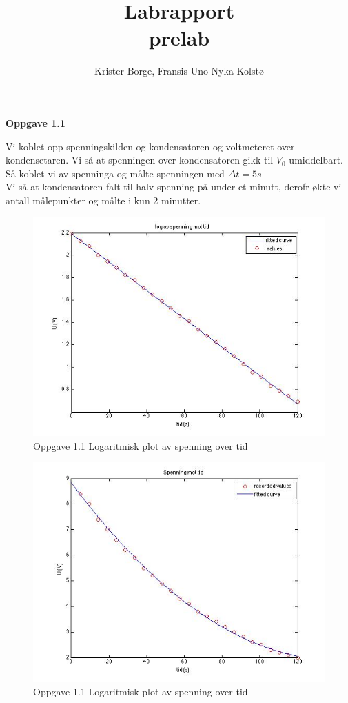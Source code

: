 \documentclass[12pt,a4paper,leqno]{report}
\author{Krister Borge, Fransis Uno Nyka Kolstø}
\title{Labrapport \\ \small{prelab}}
\begin{document}
\maketitle
\textbf{Oppgave 1.1}


Vi koblet opp spenningskilden og kondensatoren og voltmeteret over kondensetaren. Vi så at spenningen over kondensatoren gikk til $V_0$ umiddelbart. 
Så koblet vi av spenninga og målte spenningen med $\Delta t=5s$\\
Vi så at kondensatoren falt til halv spenning på under et minutt, derofr økte vi antall målepunkter og målte i kun 2 minutter.
\begin{figure}[H]
\caption{Oppgave 1.1 Logaritmisk plot av spenning over tid}
\centering
\includegraphics[width=\textwidth]{gjennomforing/oppgave11/oppgave11LOGUvT.jpg}
\end{figure}

\begin{figure}[H]
\caption{Oppgave 1.1 Logaritmisk plot av spenning over tid}
\centering
\includegraphics[width=\textwidth]{gjennomforing/oppgave11/oppgave11UvT.jpg}
\end{figure}
\end{document}
